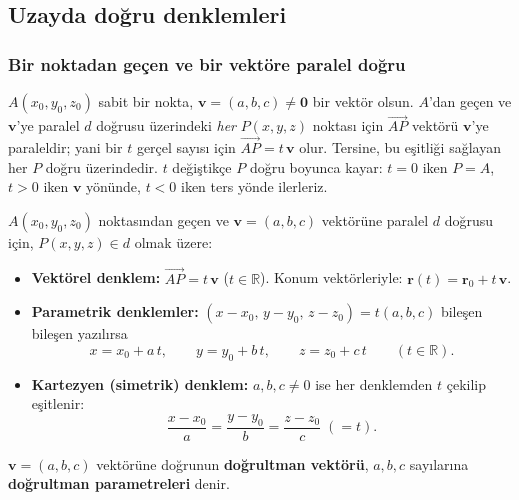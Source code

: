 \subsection{Uzayda doğru denklemleri}

\subsubsection{Bir noktadan geçen ve bir vektöre paralel doğru}

$A(x_0,y_0,z_0)$ sabit bir nokta, $\mathbf v=(a,b,c)\neq\mathbf 0$ bir vektör olsun. $A$'dan geçen ve $\mathbf v$'ye paralel $d$ doğrusu üzerindeki \emph{her} $P(x,y,z)$ noktası için $\overrightarrow{AP}$ vektörü $\mathbf v$'ye paraleldir; yani bir $t$ gerçel sayısı için $\overrightarrow{AP}=t\,\mathbf v$ olur. Tersine, bu eşitliği sağlayan her $P$ doğru üzerindedir. $t$ değiştikçe $P$ doğru boyunca kayar: $t=0$ iken $P=A$, $t>0$ iken $\mathbf v$ yönünde, $t<0$ iken ters yönde ilerleriz.

\begin{center}
\end{center}

\begin{tanim}
$A(x_0,y_0,z_0)$ noktasından geçen ve $\mathbf v=(a,b,c)$ vektörüne paralel $d$ doğrusu için, $P(x,y,z)\in d$ olmak üzere:
\begin{itemize}
  \item \textbf{Vektörel denklem:} $\overrightarrow{AP}=t\,\mathbf v$ \quad ($t\in\mathbb R$). Konum vektörleriyle: $\mathbf r(t)=\mathbf r_0+t\,\mathbf v$.
  \item \textbf{Parametrik denklemler:} $(x-x_0,\,y-y_0,\,z-z_0)=t(a,b,c)$ bileşen bileşen yazılırsa
  \[ x=x_0+a\,t,\qquad y=y_0+b\,t,\qquad z=z_0+c\,t \qquad (t\in\mathbb R). \]
  \item \textbf{Kartezyen (simetrik) denklem:} $a,b,c\neq0$ ise her denklemden $t$ çekilip eşitlenir:
  \[ \frac{x-x_0}{a}=\frac{y-y_0}{b}=\frac{z-z_0}{c}\;(=t). \]
\end{itemize}
$\mathbf v=(a,b,c)$ vektörüne doğrunun \textbf{doğrultman vektörü}, $a,b,c$ sayılarına \textbf{doğrultman parametreleri} denir.
\end{tanim}

